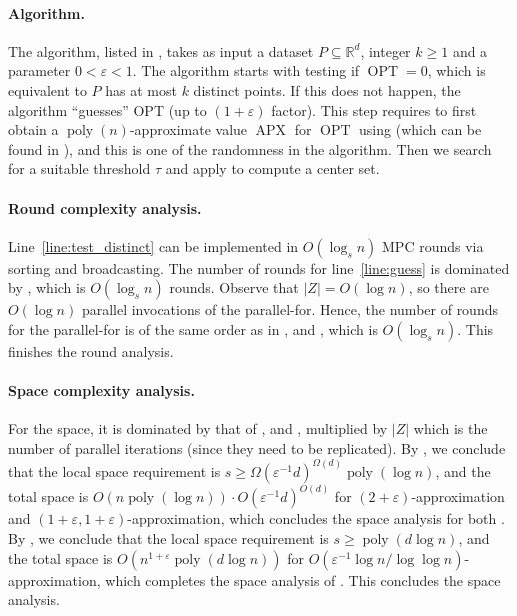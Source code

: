 \documentclass[11pt,letterpaper]{article}
\theoremstyle{plain}
\theoremstyle{definition}
\theoremstyle{remark}
\DeclareMathOperator{\poly}{poly}
\DeclareMathOperator{\OPT}{OPT}
\DeclareMathOperator{\APX}{APX}
\renewcommand{\epsilon}{\ensuremath{\varepsilon}}
\let\epsilon\varepsilon
\begin{document}
\paragraph{Algorithm.}
The algorithm, listed in , takes as input a dataset $P \subseteq \mathbb{R}^d$, integer $k \geq 1$ and a parameter $0 < \epsilon < 1$.
The algorithm starts with testing if $\OPT = 0$, which is equivalent to $P$ has at most $k$ distinct points.
If this does not happen, the algorithm ``guesses'' OPT (up to $(1 + \varepsilon)$ factor).
This step requires to first obtain a $\poly(n)$-approximate value $\APX$ for $\OPT$ using  (which can be found in ), and this is one of the randomness in the algorithm. 
Then we search for a suitable threshold $\tau$ and apply  to compute a center set. 








\paragraph{Round complexity analysis.}
Line~\ref{line:test_distinct} can be implemented in $O(\log_s n)$ MPC rounds via sorting and broadcasting. 
The number of rounds for line~\ref{line:guess} is dominated by , which is $O(\log_{s} n)$ rounds. 
Observe that $|Z| = O(\log n)$, so there are $O(\log n)$ parallel invocations of the parallel-for.
Hence, the number of rounds for the parallel-for is of the same order as in ,  and , which is $O(\log_s n)$. 
This finishes the round analysis.

\paragraph{Space complexity analysis.}
For the space, it is dominated by that of ,  and , multiplied by $|Z|$ which is the number of parallel iterations (since they need to be replicated). 
By ,
we conclude that the local space requirement is $s \geq \Omega(\varepsilon^{-1}d)^{\Omega(d)} \poly(\log n)$,
and the total space is $O(n \poly( \log n))\cdot O(\varepsilon^{-1}d)^{O(d)}$ for $(2 + \epsilon)$-approximation and $(1 + \epsilon, 1 + \epsilon)$-approximation, which concludes the space analysis for both .
By , we conclude that the local space requirement is $s\geq \poly(d\log n)$, and the total space is $O(n^{1+\epsilon}\poly(d\log n))$ for $O(\epsilon^{-1}\log n/ \log \log n)$-approximation, which completes the space analysis of . 
This concludes the space analysis.
\end{document}
